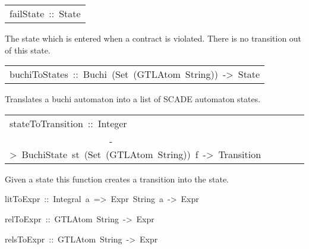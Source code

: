 \begin{haddockdesc}
\item[\begin{tabular}{@{}l}
failState\ ::\ State
\end{tabular}]\haddockbegindoc
The state which is entered when a contract is violated.
   There is no transition out of this state.
\par

\end{haddockdesc}
\begin{haddockdesc}
\item[\begin{tabular}{@{}l}
buchiToStates\ ::\ Buchi\ (Set\ (GTLAtom\ String))\ ->\ {\char 91}State{\char 93}
\end{tabular}]\haddockbegindoc
Translates a buchi automaton into a list of SCADE automaton states.
\par

\end{haddockdesc}
\begin{haddockdesc}
\item[\begin{tabular}{@{}l}
stateToTransition\ ::\ Integer\\\ \ \ \ \ \ \ \ \ \ \ \ \ \ \ \ \ \ \ \ \ ->\ BuchiState\ st\ (Set\ (GTLAtom\ String))\ f\ ->\ Transition
\end{tabular}]\haddockbegindoc
Given a state this function creates a transition into the state.
\par

\end{haddockdesc}
\begin{haddockdesc}
\item[
litToExpr\ ::\ Integral\ a\ =>\ Expr\ String\ a\ ->\ Expr
]
\item[
relToExpr\ ::\ GTLAtom\ String\ ->\ Expr
]
\item[
relsToExpr\ ::\ {\char 91}GTLAtom\ String{\char 93}\ ->\ Expr
]
\end{haddockdesc}